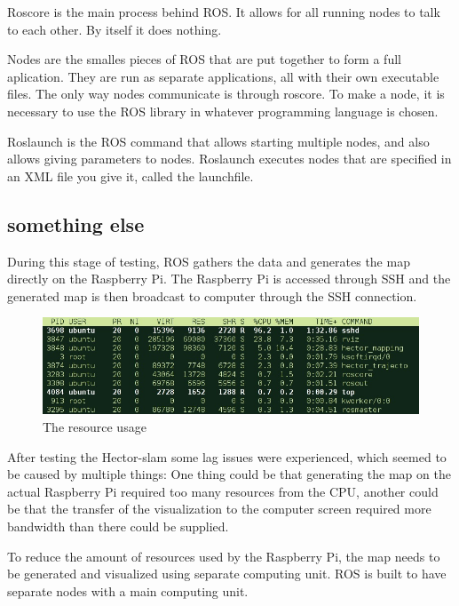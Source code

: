 Roscore is the main process behind ROS. It allows for all running nodes to talk to each other. By itself it does nothing.

Nodes are the smalles pieces of ROS that are put together to form a full aplication. They are run as separate applications, all with their own executable files. The only way nodes communicate is through roscore. To make a node, it is necessary to use the ROS library in whatever programming language is chosen.

Roslaunch is the ROS command that allows starting multiple nodes, and also allows giving parameters to nodes. Roslaunch executes nodes that are specified in an XML file you give it, called the launchfile.

\subsection{something else}
During this stage of testing, ROS gathers the data and generates the map directly on the Raspberry Pi. The Raspberry Pi is accessed through SSH and the generated map is then broadcast to computer through the SSH connection.

\begin{figure}[H]
	\centering
	\includegraphics[width=.8\linewidth]{images/rvisScreenshotCropped.jpg}
	\caption{The resource usage}
\end{figure}


After testing the Hector-slam some lag issues were experienced, which seemed to be caused by multiple things: One thing could be that generating the map on the actual Raspberry Pi required too many resources from the CPU, another could be that the transfer of the visualization to the computer screen required more bandwidth than there could be supplied.

To reduce the amount of resources used by the Raspberry Pi, the map needs to be generated and visualized using separate computing unit. ROS is built to have separate nodes with a main computing unit.

